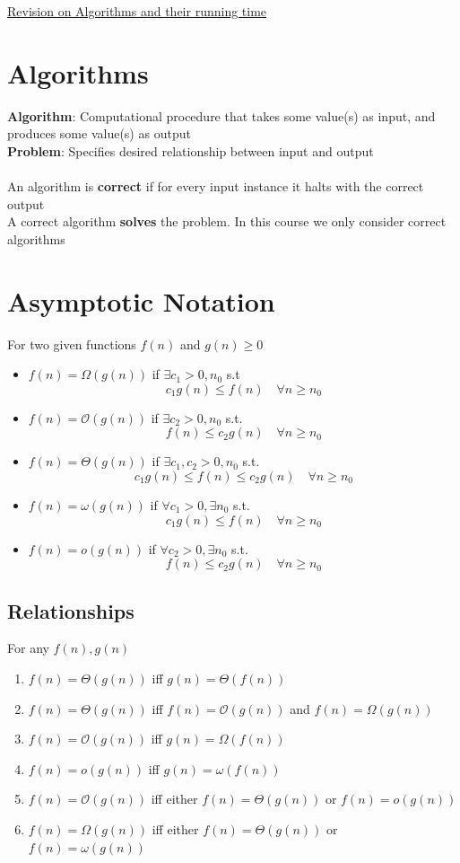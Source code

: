 \documentclass{article}[18pt]
\begin{document}
\begin{center}
\underline{\huge Revision on Algorithms and their running time}
\end{center}
\section{Algorithms}
\textbf{Algorithm}: Computational procedure that takes some value(s) as input, and produces some value(s) as output\\
\textbf{Problem}: Specifies desired relationship between input and output\\
\\
An algorithm is \textbf{correct} if for every input instance it halts with the correct output\\
A correct algorithm \textbf{solves} the problem. In this course we only consider correct algorithms
\section{Asymptotic Notation}
For two given functions $f(n)$ and $g(n)\geqslant 0$
\begin{itemize}
	\item $f(n)=\Omega(g(n))$ if $\exists c_1 > 0, n_0$ s.t
	\[
	c_{1} g(n) \leq f(n) \quad \forall n \geq n_{0}
	\]
	\item $f(n) = \mathcal{O}(g(n))$ if $\exists c_2 >0, n_0$ s.t.
	\[
	f(n) \leq c_{2} g(n) \quad \forall n \geq n_{0}
	\]
	\item $f(n) = \Theta(g(n))$ if $\exists c_1,c_2 >0, n_0$ s.t.
	\[
	c_{1} g(n) \leq f(n) \leq c_{2} g(n) \quad \forall n \geq n_{0}
	\]
	\item $f(n) = \omega(g(n))$ if $\forall c_1 > 0, \exists n_0$ s.t.
	\[
	c_{1} g(n) \leq f(n) \quad \forall n \geq n_{0}
	\]
	\item $f(n)=o(g(n))$ if $\forall c_2 >0, \exists n_0$ s.t.
	\[
	f(n) \leq c_{2} g(n) \quad \forall n \geq n_{0}
	\]
\end{itemize}
\subsection{Relationships}
For any $f(n), g(n)$
\begin{enumerate}
	\item $f(n)=\Theta(g(n))$ iff $g(n)=\Theta(f(n))$
	\item $f(n) = \Theta(g(n))$ iff $f(n)=\mathcal{O}(g(n))$ and $f(n)=\Omega(g(n))$
	\item $f(n)=\mathcal{O}(g(n))$ iff $g(n)=\Omega(f(n))$
	\item $f(n)=o(g(n))$ iff $g(n)=\omega(f(n))$
	\item $f(n)=\mathcal{O}(g(n))$ iff either $f(n)=\Theta(g(n))$ or $f(n)=o(g(n))$
	\item $f(n)=\Omega(g(n))$ iff either $f(n)=\Theta(g(n))$ or $f(n)=\omega(g(n))$
\end{enumerate}
\end{document}

